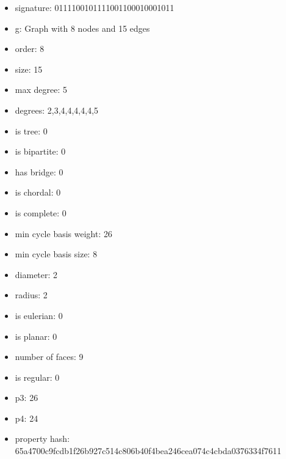 \begin{itemize}
\item signature: 0111100101111001100010001011
\item g: Graph with 8 nodes and 15 edges
\item order: 8
\item size: 15
\item max degree: 5
\item degrees: 2,3,4,4,4,4,4,5
\item is tree: 0
\item is bipartite: 0
\item has bridge: 0
\item is chordal: 0
\item is complete: 0
\item min cycle basis weight: 26
\item min cycle basis size: 8
\item diameter: 2
\item radius: 2
\item is eulerian: 0
\item is planar: 0
\item number of faces: 9
\item is regular: 0
\item p3: 26
\item p4: 24
\item property hash: 65a4700c9fcdb1f26b927c514c806b40f4bea246cea074c4cbda0376334f7611
\end{itemize}
\newpage
\begin{figure}
\end{figure}
